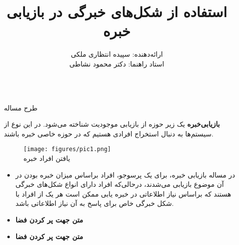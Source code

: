 \documentclass[final,hyperref={pdfpagelabels=false}]{beamer}
\title{\huge استفاده از شکل‌های خبرگی در بازیابی خبره} %
\author{ارائه‌دهنده: سپیده انتظاری ملکی     \\ استاد راهنما: دکتر محمود نشاطی}
\institute{دانشکده علوم و مهندسی کامپیوتر دانشگاه شهید بهشتی} %
\begin{document}
\DefaultMathsDigits


\begin{frame}[t] %

\begin{columns}[t] %

\begin{column}{.02\textwidth}\end{column} %

\begin{column}{.465\textwidth} %

            
\begin{block}{\timesroman طرح مساله}

\textbf{بازیابی‌خبره} یک زیر حوزه از بازیابی موجودیت شناخته می‌شود. در این نوع از سیستم‌ها به دنبال استخراج افرادی هستیم که در حوزه خاصی خبره باشند.
 

\begin{figure}
\centering
\texttt{[image: figures/pic1.png]} 
\\ {\small یافتن افراد خبره}
\end{figure}

\begin{itemize}

\item
در مساله بازیابی خبره، برای یک پرس­و­جو، افراد براساس میزان خبره بودن در آن موضوع بازیابی می‌شدند، ‌درحالی‌که افراد دارای انواع شکل‌های خبرگی هستند که براساس نیاز اطلاعاتی در خبره یابی ممکن است هر یک از افراد با شکل خبرگی خاص برای پاسخ به آن نیاز اطلاعاتی باشد.

\item {\textbf{متن جهت پر کردن فضا}}
\item {\textbf{متن جهت پر کردن فضا}}

\end{itemize}


\end{block}
\end{column}
\end{columns}
\end{frame}
\end{document}

